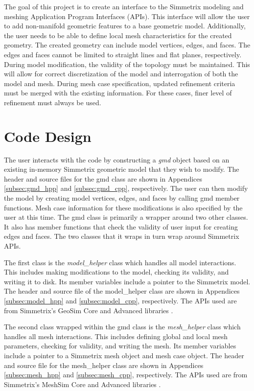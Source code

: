 \documentclass[a4paper, 12pt]{article}
\begin{document}
The goal of this project is to create an interface to the Simmetrix 
modeling and meshing Application Program Interfaces (APIs). This 
interface will allow the user to add non-manifold geometric features
to a base geometric model. Additionally, the user needs to be able
to define local mesh characteristics for the created geometry. 
The created geometry can include model vertices, edges, and faces.
The edges and faces cannot be limited to straight lines and flat 
planes, respectively. During model modification, the validity of 
the topology must be maintained. This will allow for correct 
discretization of the model and interrogation of both the model and mesh.
During mesh case specification, updated refinement criteria must be merged 
with the existing information. For these cases,
finer level of refinement must always be used. 

\section{Code Design} \label{sec:design}
The user interacts with the code by constructing a \emph{gmd}
object based on an existing in-memory Simmetrix geometric model that they 
wish to modify. The header and source files for the gmd class 
are shown in Appendices \ref{subsec:gmd_hpp} and \ref{subsec:gmd_cpp}, 
respectively.  The user can then modify the model by 
creating model vertices, edges, and faces by calling
gmd member functions. Mesh case information for these 
modifications is also specified by the user at this time.
The gmd class is primarily a wrapper around two other classes. It also
has member functions that check the validity of user input for creating 
edges and faces. The two classes that it wraps in turn wrap around Simmetrix APIs.

The first class is the \emph{model\_helper} class 
which handles all model interactions. This includes making modifications to
the model, checking its validity, and writing it to disk. Its member variables
include a pointer to the Simmetrix model. The header and source file of the 
model\_helper class are shown in Appendices \ref{subsec:model_hpp} and 
\ref{subsec:model_cpp}, respectively. The APIs used are from Simmetrix's 
GeoSim Core and Advanced libraries \cite{Simmetrix}. 

The second class wrapped within the gmd class is the
\emph{mesh\_helper} class which handles all mesh interactions. This includes
defining global and local mesh parameters, checking for validity, and writing the mesh. 
Its member variables include a pointer to a Simmetrix mesh object and mesh case object. 
The header and source file for the mesh\_helper class are shown in 
Appendices \ref{subsec:mesh_hpp} and \ref{subsec:mesh_cpp}, respectively.
The APIs used are from Simmetrix's MeshSim Core and Advanced libraries 
\cite{Simmetrix}.
\end{document}
